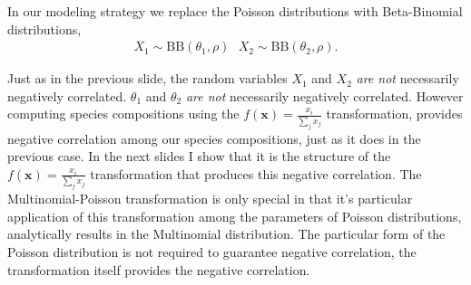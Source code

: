 \documentclass[ xcolor = pdftex, dvipsnames, table ]{beamer}
\begin{document}
%
%

%
\begin{frame}
	\footnotesize
	In our modeling strategy we replace the Poisson distributions with Beta-Binomial distributions,
	\begin{align*}
		X_{1} \sim \text{BB}(\theta_1, \rho) ~~~ X_{2} \sim \text{BB}(\theta_2, \rho).
	\end{align*}

	Just as in the previous slide, the random variables $X_{1}$ and $X_{2}$ 
	\textit{are not} necessarily negatively correlated. $\theta_1$ and $\theta_2$
	\textit{are not} necessarily negatively correlated. However computing species 
	compositions using the $f(\bm{x})=\frac{x_i}{\sum_j x_j}$ transformation, 
	provides negative correlation among our species compositions, just as it does 
	in the previous case. In the next slides I show that it is the structure of 
	the $f(\bm{x})=\frac{x_i}{\sum_j x_j}$ transformation that produces this negative 
	correlation. The Multinomial-Poisson transformation is only special in that it's
	particular application of this transformation among the parameters of Poisson 
	distributions, analytically results in the Multinomial distribution. The particular 
	form of the Poisson distribution is not required to guarantee negative correlation, 
	the transformation itself provides the negative correlation.
\end{frame}

%
%

%
\end{document}
